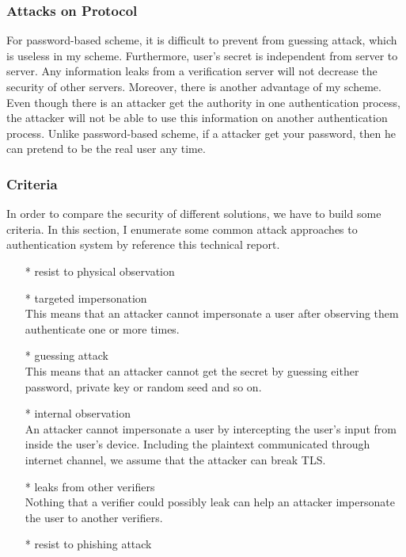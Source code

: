 \begin{CJK}{Bg5}{bsmi}
\subsubsection{Attacks on Protocol}

For password-based scheme, it is difficult to prevent from guessing attack, which is useless in my scheme. Furthermore, user's secret is independent from server to server. Any information leaks from a verification server will not decrease the security of other servers. Moreover, there is another advantage of my scheme. Even though there is an attacker get the authority in one authentication process, the attacker will not be able to use this information on another authentication process. Unlike password-based scheme, if a attacker get your password, then he can pretend to be the real user any time.

\subsubsection{Criteria}

In order to compare the security of different solutions, we have to build some criteria. In this section, I enumerate some common attack approaches to authentication system by reference this technical report\cite{password-extended}.
\begin{enumerate}
\item[*] resist to physical observation
\item[*] targeted impersonation
\\This means that an attacker cannot impersonate a user after observing them authenticate one or more times.
\item[*] guessing attack
\\This means that an attacker cannot get the secret by guessing either password, private key or random seed and so on.
\item[*] internal observation
\\An attacker cannot impersonate a user by intercepting the user's input from inside the user's device. Including the plaintext communicated through internet channel, we assume that the attacker can break TLS.
\item[*] leaks from other verifiers
\\Nothing that a verifier could possibly leak can help an attacker impersonate the user to another verifiers.
\item[*] resist to phishing attack
\end{enumerate}


\end{CJK}
